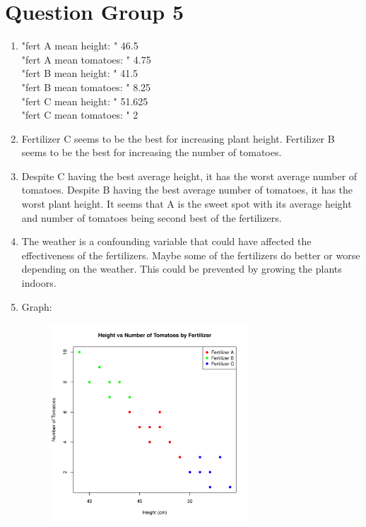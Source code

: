 \documentclass{article}
\begin{document}
\section*{Question Group 5}
\begin{enumerate}
\item "fert A mean height: "
46.5 \\
"fert A mean tomatoes: " 
4.75 \\
"fert B mean height: "
41.5 \\
"fert B mean tomatoes: "
8.25 \\
"fert C mean height: "
51.625 \\
"fert C mean tomatoes: "
2 \\
\item Fertilizer C seems to be the best for increasing plant height. Fertilizer B seems to be the best for increasing the number of tomatoes. \\
\item Despite C having the best average height, it has the worst average number of tomatoes. Despite B having the best average number of tomatoes, it has the worst plant height. It seems that A is the sweet spot with its average height and number of tomatoes being second best of the fertilizers. \\
\item The weather is a confounding variable that could have affected the effectiveness of the fertilizers. Maybe some of the fertilizers do better or worse depending on the weather. This could be prevented by growing the plants indoors. \\
\item Graph: \\
\begin{figure}[ht]
  \centering
  \includegraphics[width=0.7\textwidth]{Rplots-1.png}

\end{figure}
\end{enumerate}
\end{document}
